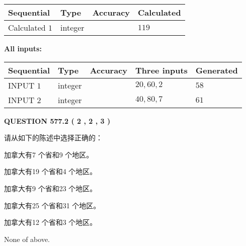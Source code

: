 \documentclass{ctexart}
\begin{document}
   
   
   
\noindent{}
   
   
  
  
\noindent\begin{tabular}{|l|l|l|l|}
\hline
 Sequential & Type & Accuracy & Calculated \\ 
\hline
 
 
  Calculated $  1 $ & integer &  & 
  $ 119 $ 
 \\  \hline  
 \end{tabular}
   
   
   
   
\noindent\vspace{0.1in}\hspace{-0.08in} {\textbf{\Large{All inputs: }}}
   
   
  
  
\noindent\begin{tabular}{|l|l|l|l|l|}
\hline
 Sequential & Type & Accuracy & Three inputs & Generated \\ 
\hline
 
 
  INPUT $  1 $ & integer &  & $
 20
 , 
 60
 , 
 2
 $ & $ 58 $ 
 \\  \hline  
 
 
  INPUT $  2 $ & integer &  & $
 40
 , 
 80
 , 
 7
 $ & $ 61 $ 
 \\  \hline  
 \end{tabular}
   
   
  
\vspace{0.2in}
  
{\textbf{\Large{QUESTION
577.2 
 ( 2 , 2 , 3 )
}}}
  
  
请从如下的陈述中选择正确的：
 
 
加拿大有7 个省和9 个地区。
 
 
加拿大有19 个省和4 个地区。
 
 
加拿大有9 个省和23 个地区。
 
 
加拿大有25 个省和31 个地区。
 
 
加拿大有12 个省和3 个地区。
 
 
 None of above.
 
 
\noindent{}
 
\end{document}

